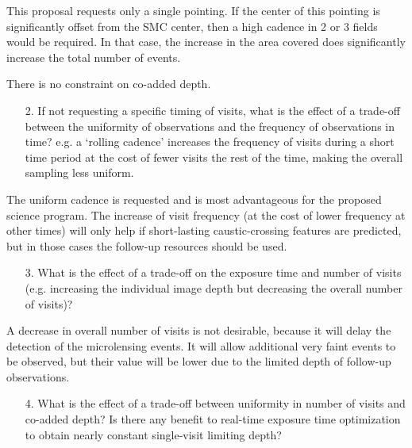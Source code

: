\documentclass[12pt,letterpaper]{article}
\begin{document}
This proposal requests only a single pointing.  If the center of this pointing is significantly offset from 
the SMC center, then a high cadence in 2 or 3 fields would be required.  
In that case, the increase in the area covered does significantly increase the total number of events.

There is no constraint on co-added depth. 

\begin{footnotesize}
\begin{enumerate}
    \item[2.] If not requesting a specific timing of visits, what is the effect of a trade-off between the uniformity of observations and the frequency of observations in time? e.g. a `rolling cadence' increases the frequency of visits during a short time period at the cost of fewer visits the rest of the time, making the overall sampling less uniform.
\end{enumerate}
\end{footnotesize}

The uniform cadence is requested and is most advantageous for the proposed 
science program.  The increase of visit frequency (at the cost of lower 
frequency at other times) will only help if short-lasting caustic-crossing 
features are predicted, but in those cases the follow-up resources should be used.

\begin{footnotesize}
\begin{enumerate}
    \item[3.] What is the effect of a trade-off on the exposure time and number of visits (e.g. increasing the individual image depth but decreasing the overall number of visits)?
\end{enumerate}
\end{footnotesize}

A decrease in overall number of visits is not desirable, because it will delay 
the detection of the microlensing events.  It will allow additional very faint 
events to be observed, but their value will be lower due to the limited depth of 
follow-up observations. 

\begin{footnotesize}
\begin{enumerate}
    \item[4.] What is the effect of a trade-off between uniformity in number of visits and co-added depth? Is there any benefit to real-time exposure time optimization to obtain nearly constant single-visit limiting depth?
\end{enumerate}
\end{footnotesize}
\end{document}

